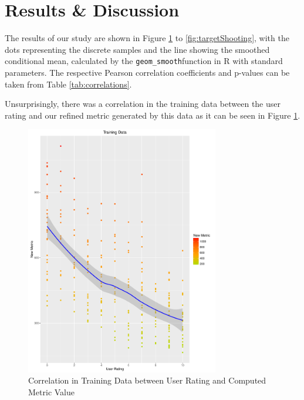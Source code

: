 \documentclass{sig-alternate-05-2015}
\begin{document}
\section{Results \& Discussion}

The results of our study are shown in Figure \ref{fig:trainingData} to \ref{fig:targetShooting}, with the dots representing the discrete samples and the line showing the smoothed conditional mean, calculated by the \texttt{geom\_smooth}function in R with standard parameters. The respective Pearson correlation coefficients and p-values can be taken from Table \ref{tab:correlations}.

Unsurprisingly, there was a correlation in the training data between the user rating and our refined metric generated by this data as it can be seen in Figure \ref{fig:trainingData}. 


\begin{figure}
\centering
\includegraphics[width=8.45cm]{TrainingData}
\vspace{-20pt}
\caption{Correlation in Training Data between User Rating and Computed Metric Value}
\label{fig:trainingData}
\vspace{-10pt}
\end{figure}
\end{document}
